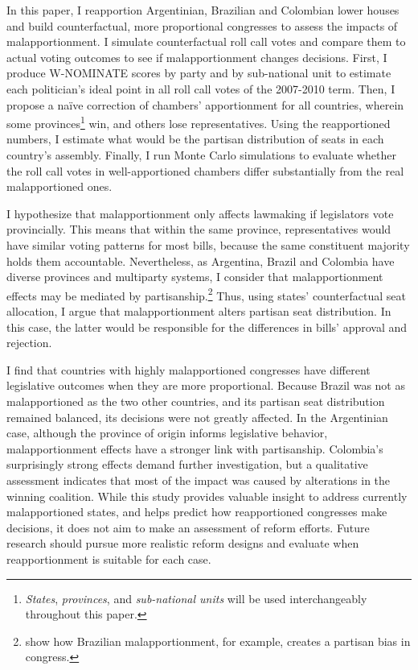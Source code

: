 \documentclass[a4paper,12pt]{article}
\begin{document}
In this paper, I reapportion Argentinian, Brazilian and Colombian lower houses and build counterfactual, more proportional congresses to assess the impacts of malapportionment. I simulate counterfactual roll call votes and compare them to actual voting outcomes to see if malapportionment changes decisions. First, I produce W-NOMINATE scores \citep{poole2011ideology} by party and by sub-national unit to estimate each politician's ideal point in all roll call votes of the 2007-2010 term. Then, I propose a naïve correction of chambers' apportionment for all countries, wherein some provinces\footnote{\textit{States}, \textit{provinces}, and \textit{sub-national units} will be used interchangeably throughout this paper.} win, and others lose representatives. Using the reapportioned numbers, I estimate what would be the partisan distribution of seats in each country's assembly. Finally, I run Monte Carlo simulations to evaluate whether the roll call votes in well-apportioned chambers differ substantially from the real malapportioned ones.

I hypothesize that malapportionment only affects lawmaking if legislators vote provincially. This means that within the same province, representatives would have similar voting patterns for most bills, because the same constituent majority holds them accountable. Nevertheless, as Argentina, Brazil and Colombia have diverse provinces and multiparty systems, I consider that malapportionment effects may be mediated by partisanship.\footnote{\citet{cavalcante2015desproporcionalidade} show how Brazilian malapportionment, for example, creates a partisan bias in congress.} Thus, using states' counterfactual seat allocation, I argue that malapportionment alters partisan seat distribution. In this case, the latter would be responsible for the differences in bills' approval and rejection.

I find that countries with highly malapportioned congresses have different legislative outcomes when they are more proportional. Because Brazil was not as malapportioned as the two other countries, and its partisan seat distribution remained balanced, its decisions were not greatly affected. In the Argentinian case, although the province of origin informs legislative behavior, malapportionment effects have a stronger link with partisanship. Colombia's surprisingly strong effects demand further investigation, but a qualitative assessment indicates that most of the impact was caused by alterations in the winning coalition. While this study provides valuable insight to address currently malapportioned states, and helps predict how reapportioned congresses make decisions, it does not aim to make an assessment of reform efforts. Future research should pursue more realistic reform designs and evaluate when reapportionment is suitable for each case.
\end{document}
